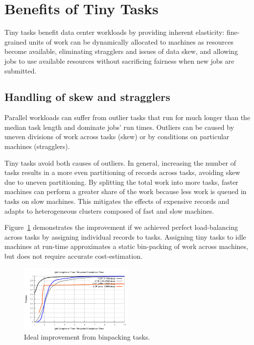 \section{Benefits of Tiny Tasks}
\label{sec:benefits}
Tiny tasks benefit data center workloads by providing inherent elasticity:
fine-grained units of work can be dynamically allocated to machines as
resources become available, eliminating stragglers and issues of data skew,
and allowing jobs to use available resources without sacrificing fairness
when new jobs are submitted.

\subsection{Handling of skew and stragglers}
Parallel workloads can suffer from outlier tasks that run for much longer than the median task length and dominate jobs' run times.
Outliers can be caused by uneven divisions of work across tasks (skew) or by conditions on particular machines (stragglers).


Tiny tasks avoid both causes of outliers.
In general, increasing the number of tasks results in a more even partitioning of records across tasks, avoiding skew due to uneven partitioning.
By splitting the total work into more tasks, faster machines can perform a greater share of the work because less work is queued in tasks on slow machines.
This mitigates the effects of expensive records and adapts to heterogeneous clusters composed of fast and slow machines.

Figure~\ref{fig:binpacked} demonstrates the improvement if we
achieved perfect load-balancing across tasks by assigning individual records to tasks.
Assigning tiny tasks to idle machines at run-time approximates a static bin-packing of work across machines, but does not require accurate cost-estimation.

\begin{figure}[t]
\centering
\hspace{2ex}
\includegraphics[width=0.5\textwidth]{figures/binpacked1-sep}
\vspace{-4ex}
\caption{Ideal improvement from binpacking tasks.}
\vspace{-2ex}
\label{fig:binpacked}
\end{figure}



